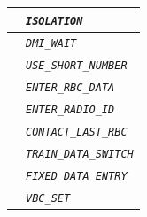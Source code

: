 \documentclass{template/openetcs}
\begin{document}
\begin{itemize}
\begin{longtable}{|l|l|}
				\hline
				
				&	\begin{minipage}[t]{0.78\linewidth} \emph{\texttt{ISOLATION}} \end{minipage} \\
				
				\hline
				
				&	\begin{minipage}[t]{0.78\linewidth} \emph{\texttt{DMI\_WAIT}} \end{minipage} \\
				
				\hline
				
				&	\begin{minipage}[t]{0.78\linewidth} \emph{\texttt{USE\_SHORT\_NUMBER}} \end{minipage} \\
				
				\hline
				
				&	\begin{minipage}[t]{0.78\linewidth} \emph{\texttt{ENTER\_RBC\_DATA}} \end{minipage} \\
				
				\hline
				
				&	\begin{minipage}[t]{0.78\linewidth} \emph{\texttt{ENTER\_RADIO\_ID}} \end{minipage} \\
				
				\hline
				
				&	\begin{minipage}[t]{0.78\linewidth} \emph{\texttt{CONTACT\_LAST\_RBC}} \end{minipage} \\
				
				\hline
				
				&	\begin{minipage}[t]{0.78\linewidth} \emph{\texttt{TRAIN\_DATA\_SWITCH}} \end{minipage} \\
				
				\hline
				
				&	\begin{minipage}[t]{0.78\linewidth} \emph{\texttt{FIXED\_DATA\_ENTRY}} \end{minipage} \\
				
				\hline
				
				&	\begin{minipage}[t]{0.78\linewidth} \emph{\texttt{VBC\_SET}} \end{minipage} \\
				

\end{longtable}
\end{itemize}
\end{document}
